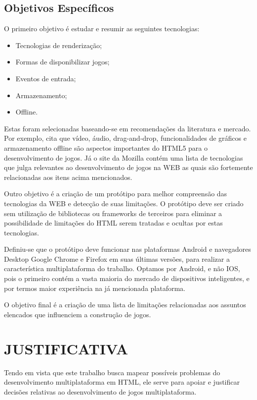 \subsection{Objetivos Específicos}

O primeiro objetivo é estudar e resumir as seguintes tecnologias:
\begin{itemize}
\item Tecnologias de renderização;
\item Formas de disponibilizar jogos;
\item Eventos de entrada;
\item Armazenamento;
\item Offline.
\end{itemize}

Estas foram selecionadas baseando-se em recomendações da literatura
e mercado. Por exemplo, \citet{browserGamesTechnologyAndFuture} cita
que vídeo, áudio, drag-and-drop, funcionalidades de gráficos e
armazenamento offline são aspectos importantes do HTML5 para o
desenvolvimento de jogos. Já o site da Mozilla \citet{gamesIntroduction}
contém uma lista de tecnologias que julga relevantes ao desenvolvimento
de jogos na WEB as quais são fortemente relacionadas aos itens acima
mencionados.

Outro objetivo é a criação de um protótipo para melhor compreensão
das tecnologias da WEB e detecção de suas limitações. O protótipo
deve ser criado sem utilização de bibliotecas ou frameworks de
terceiros para eliminar a possibilidade de limitações  do HTML serem tratadas
e ocultas por estas tecnologias. 

Definiu-se que o protótipo deve funcionar nas plataformas Android e
navegadores Desktop Google Chrome e Firefox em suas últimas versões,
para realizar a característica multiplataforma do trabalho.  Optamos por
Android, e não IOS, pois o primeiro contém a vasta maioria do mercado
de dispositivos inteligentes, e por termos maior experiência na já
mencionada plataforma.

O objetivo final é a criação de uma lista de limitações relacionadas
aos assuntos elencados que influenciem a construção de jogos.

\section{JUSTIFICATIVA}

Tendo em vista que este trabalho busca mapear possíveis problemas
do desenvolvimento multiplataforma em HTML, ele serve para apoiar
e justificar decisões relativas ao desenvolvimento de jogos
multiplataforma.

